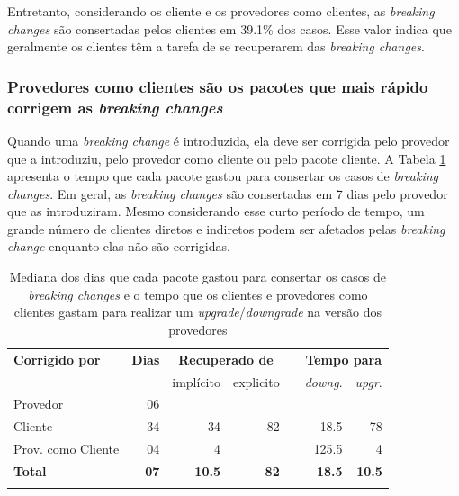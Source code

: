 Entretanto, considerando os cliente e os provedores como clientes, as \textit{breaking changes} são consertadas pelos clientes em 39.1\% dos casos. Esse valor indica que geralmente os clientes têm a tarefa de se recuperarem das \textit{breaking changes}.

\subsubsection{Provedores como clientes são os pacotes que mais rápido corrigem as \textit{breaking changes}}

Quando uma \textit{breaking change} é introduzida, ela deve ser corrigida pelo provedor que a introduziu, pelo provedor como cliente ou pelo pacote cliente. A Tabela \ref{tab:fix_day} apresenta o tempo que cada pacote gastou para consertar os casos de \textit{breaking changes}. Em geral, as \textit{breaking changes} são consertadas em 7 dias pelo provedor que as introduziram. Mesmo considerando esse curto período de tempo, um grande número de clientes diretos e indiretos podem ser afetados pelas \textit{breaking change} enquanto elas não são corrigidas.

\begin{table}
	\centering
	\caption{Mediana dos dias que cada pacote gastou para consertar os casos de \textit{breaking changes} e o tempo que os clientes e provedores como clientes gastam para realizar um \textit{upgrade}/\textit{downgrade} na versão dos provedores}
	\begin{tabular}{lrrrrrr} \toprule
		\textbf{Corrigido por} & \textbf{Dias} & \multicolumn{2}{c}{\textbf{Recuperado de}} & \phantom{ab} & \multicolumn{2}{c}{\textbf{Tempo para}}
		\\
		\cmidrule{3-4} \cmidrule{6-7}
		&    & implícito    & explicito    && \textit{downg}.       & \textit{upgr}.       \\ \midrule
		Provedor        & 06 & \textemdash & \textemdash && \textemdash  & \textemdash \\
		Cliente          & 34 & 34          & 82          && 18.5         & 78          \\
		Prov. como Cliente & 04 & 4           & \textemdash && 125.5        & 4           \\ \hline
		\textbf{Total}  & \textbf{07} & \textbf{10.5} & \textbf{82} && \textbf{18.5} & \textbf{10.5} \\
		\bottomrule
		\label{tab:fix_day}
	\end{tabular}
\end{table}

